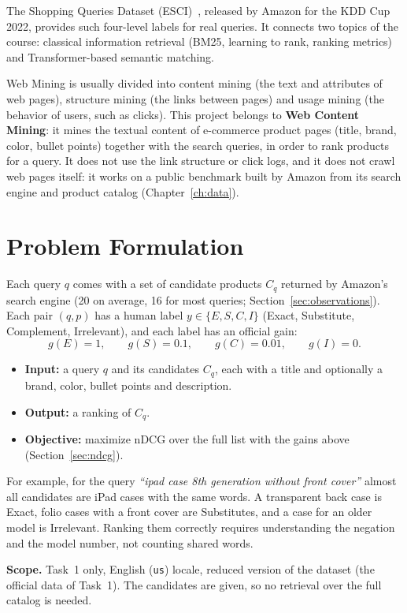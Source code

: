 \documentclass[12pt,a4paper]{report}
\begin{document}
The Shopping Queries Dataset (ESCI)~\cite{esci,aicrowd}, released by Amazon for the KDD Cup 2022, provides such four-level labels for real queries. It connects two topics of the course: classical information retrieval (BM25, learning to rank, ranking metrics) and Transformer-based semantic matching.

Web Mining is usually divided into content mining (the text and attributes of web pages), structure mining (the links between pages) and usage mining (the behavior of users, such as clicks). This project belongs to \textbf{Web Content Mining}: it mines the textual content of e-commerce product pages (title, brand, color, bullet points) together with the search queries, in order to rank products for a query. It does not use the link structure or click logs, and it does not crawl web pages itself: it works on a public benchmark built by Amazon from its search engine and product catalog (Chapter~\ref{ch:data}).

\section{Problem Formulation}
Each query $q$ comes with a set of candidate products $C_q$ returned by Amazon's search engine (20 on average, 16 for most queries; Section~\ref{sec:observations}). Each pair $(q,p)$ has a human label $y \in \{E,S,C,I\}$ (Exact, Substitute, Complement, Irrelevant), and each label has an official gain:
\[
g(E)=1,\qquad g(S)=0.1,\qquad g(C)=0.01,\qquad g(I)=0 .
\]
\begin{itemize}
  \item \textbf{Input:} a query $q$ and its candidates $C_q$, each with a title and optionally a brand, color, bullet points and description.
  \item \textbf{Output:} a ranking of $C_q$.
  \item \textbf{Objective:} maximize nDCG over the full list with the gains above (Section~\ref{sec:ndcg}).
\end{itemize}
For example, for the query \emph{``ipad case 8th generation without front cover''} almost all candidates are iPad cases with the same words. A transparent back case is Exact, folio cases with a front cover are Substitutes, and a case for an older model is Irrelevant. Ranking them correctly requires understanding the negation and the model number, not counting shared words.

\textbf{Scope.} Task~1 only, English (\texttt{us}) locale, reduced version of the dataset (the official data of Task~1). The candidates are given, so no retrieval over the full catalog is needed.
\end{document}
